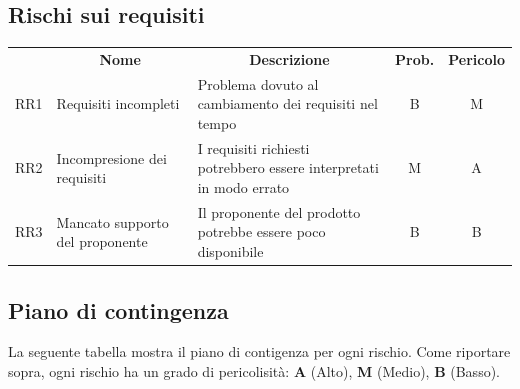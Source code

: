 \subsection{Rischi sui requisiti}
\begin{table}[H]
\centering
\renewcommand{\arraystretch}{1.8}
    \begin{tabular}{c | p{4.2cm} | p{5cm} |c |  c  }
		\rowcolor[HTML]{a52a2a}
        \multicolumn{1}{c}{\color[HTML]{FFFFFF} \textbf{Codice}} &
        \multicolumn{1}{c}{\color[HTML]{FFFFFF} \textbf{Nome}} &
        \multicolumn{1}{c}{\color[HTML]{FFFFFF} \textbf{Descrizione}} &
        \multicolumn{1}{c}{\color[HTML]{FFFFFF} \textbf{Prob.}} &
        \multicolumn{1}{c}{\color[HTML]{FFFFFF} \textbf{Pericolo}}\\
	
    RR1 & Requisiti incompleti & Problema dovuto al cambiamento dei requisiti nel tempo & B & M \\
    RR2 & Incompresione dei requisiti & I requisiti richiesti potrebbero essere interpretati in modo errato & M & A \\
    RR3 & Mancato supporto del proponente & Il proponente del prodotto potrebbe essere poco disponibile & B & B  \\
\end{tabular}
	
\end{table}

\pagebreak
\noindent
\subsection{Piano di contingenza}
La seguente tabella mostra il piano di contigenza per ogni rischio.
Come riportare sopra, ogni rischio ha un grado di pericolisità: \textbf{A} (Alto), \textbf{M} (Medio), \textbf{B} (Basso).


